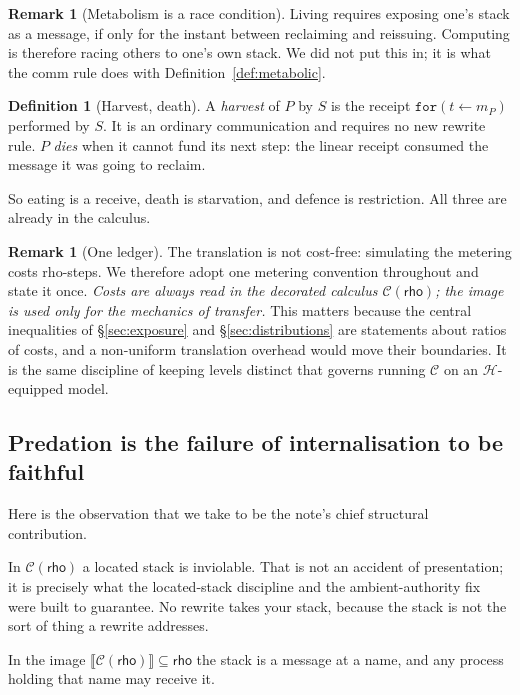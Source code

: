 \documentclass[11pt]{article}
\theoremstyle{plain}
\theoremstyle{definition}
\newtheorem{definition}[theorem]{Definition}
\newtheorem{remark}[theorem]{Remark}
\newcommand{\rhoc}{\textsf{rho}}
\newcommand{\Crho}{\mathcal{C}(\rhoc)}
\newcommand{\enc}[1]{\llbracket #1 \rrbracket}
\begin{document}
\begin{remark}[Metabolism is a race condition]
\label{rem:race}
Living requires exposing one's stack as a message, if only for the instant between reclaiming and
reissuing. Computing is therefore racing others to one's own stack. We did not put this in; it is
what the comm rule does with Definition~\ref{def:metabolic}.
\end{remark}

\begin{definition}[Harvest, death]
\label{def:harvest}
A \emph{harvest} of $P$ by $S$ is the receipt $\texttt{for}(t \leftarrow m_P)$ performed by $S$. It is
an ordinary communication and requires no new rewrite rule. $P$ \emph{dies} when it cannot fund its
next step: the linear receipt consumed the message it was going to reclaim.
\end{definition}

So eating is a receive, death is starvation, and defence is restriction. All three are already in the
calculus.

\begin{remark}[One ledger]
The translation is not cost-free: simulating the metering costs \rhoc-steps. We therefore adopt one
metering convention throughout and state it once. \emph{Costs are always read in the decorated
calculus $\Crho$; the image is used only for the mechanics of transfer.} This matters because the
central inequalities of \S\ref{sec:exposure} and \S\ref{sec:distributions} are statements about ratios
of costs, and a non-uniform translation overhead would move their boundaries. It is the same
discipline of keeping levels distinct that governs running $\mathcal{C}$ on an
$\mathcal{H}$-equipped model.
\end{remark}

\subsection{Predation is the failure of internalisation to be faithful}

Here is the observation that we take to be the note's chief structural contribution.

In $\Crho$ a located stack is inviolable. That is not an accident of presentation; it is precisely
what the located-stack discipline and the ambient-authority fix were built to guarantee. No rewrite
takes your stack, because the stack is not the sort of thing a rewrite addresses.

In the image $\enc{\Crho} \subseteq \rhoc$ the stack is a message at a name, and any process holding
that name may receive it.
\end{document}
